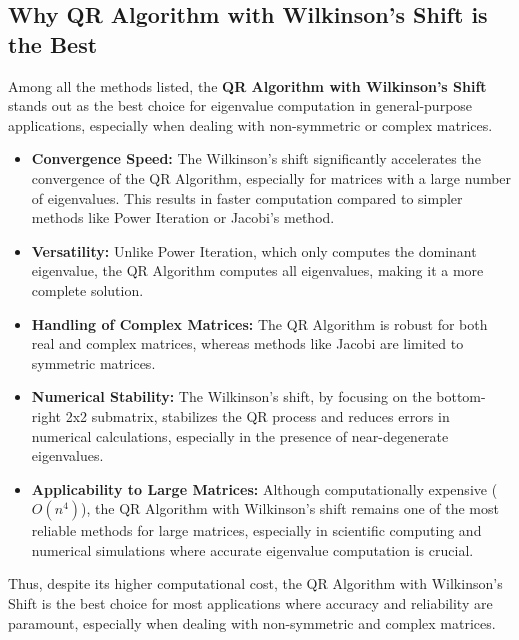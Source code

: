 \documentclass[journal]{IEEEtran}
\begin{document}
\subsection{Why QR Algorithm with Wilkinson's Shift is the Best}
Among all the methods listed, the \textbf{QR Algorithm with Wilkinson's Shift} stands out as the best choice for eigenvalue computation in general-purpose applications, especially when dealing with non-symmetric or complex matrices. 
\begin{itemize}
    \item \textbf{Convergence Speed:} The Wilkinson's shift significantly accelerates the convergence of the QR Algorithm, especially for matrices with a large number of eigenvalues. This results in faster computation compared to simpler methods like Power Iteration or Jacobi's method.
    \item \textbf{Versatility:} Unlike Power Iteration, which only computes the dominant eigenvalue, the QR Algorithm computes all eigenvalues, making it a more complete solution.
    \item \textbf{Handling of Complex Matrices:} The QR Algorithm is robust for both real and complex matrices, whereas methods like Jacobi are limited to symmetric matrices.
    \item \textbf{Numerical Stability:} The Wilkinson's shift, by focusing on the bottom-right 2x2 submatrix, stabilizes the QR process and reduces errors in numerical calculations, especially in the presence of near-degenerate eigenvalues.
    \item \textbf{Applicability to Large Matrices:} Although computationally expensive ($O(n^4)$), the QR Algorithm with Wilkinson's shift remains one of the most reliable methods for large matrices, especially in scientific computing and numerical simulations where accurate eigenvalue computation is crucial.
\end{itemize}

Thus, despite its higher computational cost, the QR Algorithm with Wilkinson's Shift is the best choice for most applications where accuracy and reliability are paramount, especially when dealing with non-symmetric and complex matrices.
\end{document}
